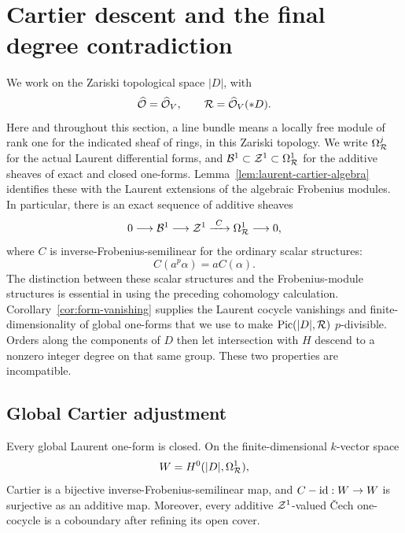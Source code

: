 \section{Cartier descent and the final degree contradiction}
\label{sec:cartier}

We work on the Zariski topological space \(|D|\), with
\[
 \widehat{\mathcal O}=\widehat{\mathcal O}_V,
 \qquad \mathcal R=\widehat{\mathcal O}_V(*D).
\]
Here and throughout this section, a line bundle means a locally free
module of rank one for the indicated sheaf of rings, in this Zariski
topology.  We write \(\Omega^j_{\mathcal R}\) for the actual Laurent
differential forms, and \(\mathcal B^1\subset\mathcal Z^1\subset\Omega^1_{\mathcal R}\)
for the additive sheaves of exact and closed one-forms.
Lemma~\ref{lem:laurent-cartier-algebra} identifies these with the
Laurent extensions of the algebraic Frobenius modules.  In particular,
there is an exact sequence of additive sheaves
\begin{equation}
 0\longrightarrow\mathcal B^1\longrightarrow\mathcal Z^1
   \xrightarrow{\ C\ }\Omega^1_{\mathcal R}\longrightarrow0,
 \label{eq:laurent-cartier-sequence}
\end{equation}
where \(C\) is inverse-Frobenius-semilinear for the ordinary scalar
structures:
\[
 C(a^p\alpha)=aC(\alpha).
\]
The distinction between these scalar structures and the
Frobenius-module structures is essential in using the preceding
cohomology calculation.
Corollary~\ref{cor:form-vanishing} supplies the Laurent cocycle
vanishings and finite-dimensionality of global one-forms that we use
to make $\operatorname{Pic}(|D|,\mathcal R)$ $p$-divisible.
Orders along the components of $D$ then let intersection with $H$
descend to a nonzero integer degree on that same group.  These two
properties are incompatible.

\subsection{Global Cartier adjustment}

\begin{lemma}
\label{lem:cartier-adjustment}
Every global Laurent one-form is closed.  On the finite-dimensional
\(k\)-vector space
\[
 W=H^0(|D|,\Omega^1_{\mathcal R}),
\]
Cartier is a bijective inverse-Frobenius-semilinear map, and
\(C-\operatorname{id}:W\to W\) is surjective as an additive map.
Moreover, every additive \(\mathcal Z^1\)-valued \v Cech one-cocycle
is a coboundary after refining its open cover.
\end{lemma}

